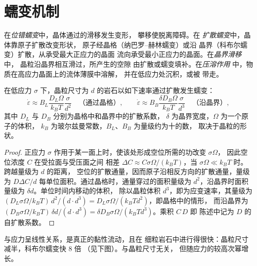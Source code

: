 \section{蠕变机制}

\begin{definition}[蠕变机制]\label{def:b3:deformation-mechanisms:creep}
在\emph{位错蠕变}中，晶体通过的滑移发生变形，
攀移使脱离障碍。在
\emph{扩散蠕变}中，晶体靠原子扩散改变形状，
原子经晶格（纳巴罗–赫林蠕变）或沿
晶界（科布尔蠕变）扩散，从承受最大正应力的晶面
流向承受最小正应力的晶面。在\emph{晶界滑移}中，
晶粒沿晶界相互滑过，所产生的空隙
由扩散或蠕变填补。在\emph{压溶作用}
中，物质在高应力晶面上的流体薄膜中溶解，
并在低应力处沉积，或被
带走。
\end{definition}

\begin{proposition}[扩散蠕变的晶粒尺寸依赖性]\label{prop:b3:deformation-mechanisms:grain-size}
在低应力 $\sigma$ 下，晶粒尺寸为 $d$ 的岩石以如下速率通过扩散发生蠕变：
\[
  \dot\varepsilon \approx B_L\frac{D_L\Omega}{k_BT}\frac{\sigma}{d^2}
  \quad\text{（通过晶格）},\qquad
  \dot\varepsilon \approx B_B\frac{\delta D_B\Omega}{k_BT}\frac{\sigma}{d^3}
  \quad\text{（沿晶界）},
\]
其中 $D_L$ 与 $D_B$ 分别为晶格中和晶界中的扩散系数，
$\delta$ 为晶界宽度，$\Omega$ 为一个原子的体积，
$k_B$ 为玻尔兹曼常数，$B_L$、$B_B$ 为量级约为十的数，
取决于晶粒的形状。
\end{proposition}

\begin{proof}
正应力 $\sigma$ 作用于某一面上时，使该处形成空位所需的功改变 $\sigma\Omega$，
因此空位浓度 $C$ 在受拉面与受压面之间
相差 $\Delta C \approx C\sigma\Omega/
(k_BT)$，当 $\sigma\Omega \ll k_BT$ 时。跨越量级为 $d$ 的距离，
空位的扩散通量，因而原子沿相反方向的扩散通量，量级为 $D\Delta
C/d$ 每单位面积。通过晶格时，通量穿过的面积量级为
$d^2$，沿晶界时面积量级为 $\delta d$。单位时间内移动的体积，
除以晶粒体积 $d^3$，即为应变速率，其量级为
$(D_L\sigma\Omega/k_BT)\,d^2/(d\cdot d^3) = D_L\sigma\Omega/(k_BTd^2)$，即晶格中的情形，
而沿晶界为 $(D_B\sigma\Omega/k_BT)\,\delta d/(d\cdot d^3) = \delta D_B
\sigma\Omega/(k_BTd^3)$。乘积 $C\,D$ 即
陈述中记为 $D$ 的自扩散系数。
\end{proof}

与应力呈线性关系，是真正的黏性流动，且在
细粒岩石中进行得很快：晶粒尺寸减半，科布尔蠕变快 8 倍
（见下图）。与晶粒尺寸无关，
但随应力的较高次幂增长。

